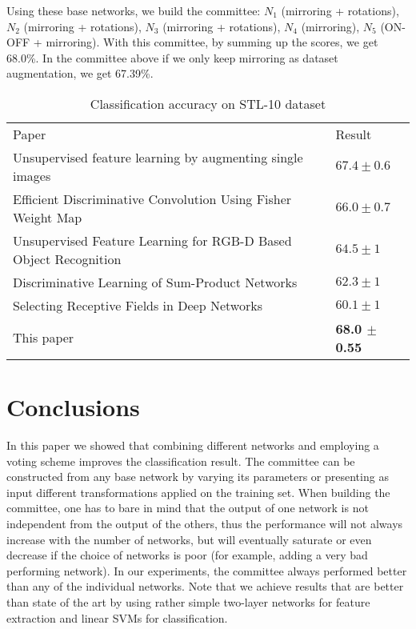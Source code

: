 \documentclass[runningheads]{llncs}
\begin{document}
Using these base networks, we build the committee: $N_1$ (mirroring + rotations), $N_2$ (mirroring + rotations), $N_3$ (mirroring + rotations), $N_4$ (mirroring), $N_5$ (ON-OFF + mirroring).
With this committee, by summing up the scores, we get 68.0\%. 
In the committee above if we only keep mirroring as dataset augmentation, we get 67.39\%.


\setlength{\tabcolsep}{4pt}
\begin{table}
\begin{center}
\caption{Classification accuracy on STL-10 dataset}
\begin{tabular}{l|l}
\hline\noalign{\smallskip}
Paper & Result \\
\noalign{\smallskip}
\hline
\noalign{\smallskip}
Unsupervised feature learning by augmenting single
images \cite{DBLP:journals/corr/DosovitskiySB13}  & $67.4 \pm 0.6$ \\
Efficient Discriminative Convolution Using
Fisher Weight Map \cite{EDCUFWM}  & $66.0 \pm 0.7$ \\
Unsupervised Feature Learning for RGB-D Based Object Recognition \cite{bo_iser12} & $64.5 \pm 1$ \\
Discriminative Learning of Sum-Product Networks \cite{NIPS2012_4516} & $62.3 \pm 1$ \\
Selecting Receptive Fields in Deep Networks \cite{NIPS2011_4293} & $60.1 \pm 1$ \\
This paper & \bf 68.0 $\pm$ 0.55 \\
\hline
\end{tabular}
\end{center}
\end{table}
\setlength{\tabcolsep}{1.4pt}

\vspace{-1cm}

\section{Conclusions}
In this paper we showed that combining different networks and employing a voting scheme improves the classification result.
The committee can be constructed from any base network by varying its parameters or presenting as input different transformations applied on the training set.
When building the committee, one has to bare in mind that the output of one network is not independent from the output of the others, thus the performance will not always increase with the number of networks, but will eventually saturate or even decrease if the choice of networks is poor (for example, adding a very bad performing network). In our experiments, the committee always performed better than any of the individual networks.
Note that we achieve results that are better than state of the art by using rather simple two-layer networks for feature extraction and linear SVMs for classification.



\end{document}
